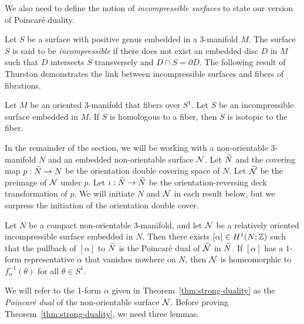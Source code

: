 We also need to define the notion of \emph{incompressible surfaces} to state our version of Poincar\'e duality.

  Let $S$ be a surface with positive genus embedded in a $3$-manifold $M$.
  The surface $S$ is said to be \emph{incompressible} if there does not exist an embedded disc $D$ in $M$ such that $D$ intersects $S$ transversely and $D \cap S = \partial D$.
  The following result of Thurston demonstrates the link between incompressible surfaces and fibers of fibrations.

\begin{thm}
  \label{thm:Thur2}
Let $M$ be an oriented 3-manifold that fibers over $S^1$.  Let $S$ be an incompressible surface embedded in $M$.  If $S$ is homologous to a fiber, then $S$ is isotopic to the fiber.
\end{thm}



In the remainder of the section, we will be working with a non-orientable 3-manifold $N$ and an embedded non-orientable surface $\mathcal{N}$.   Let $\widetilde{N}$ and the covering map $p:\widetilde{N}\rightarrow N$ be the orientation double covering space of $N$.  Let $\widetilde{\mathcal{N}}$ be the preimage of $\mathcal{N}$ under $p$.  Let $\iota:\widetilde{N}\rightarrow\widetilde{N}$ be the orientation-reversing deck transformation of $p$.  We will initiate $N$ and $\mathcal{N}$ in each result below, but we surpress the initiation of the orientation double cover.

\begin{thm}
  \label{thm:strong-duality}
  Let $N$ be a compact non-orientable $3$-manifold, and let $\mathcal{N}$ be a relatively oriented incompressible surface embedded in $N$.
  Then there exists $[\alpha] \in H^1(N; \mathbb{Z})$ such that the pullback of $[\alpha]$ to $\widetilde{N}$ is the Poincar\'e dual of $\widetilde{\mathcal{N}}$ in $\widetilde{N}$.
  If $[\alpha]$ has a $1$-form representative $\alpha$ that vanishes nowhere on $N$, then $\mathcal{N}$ is homeomorphic to $f_{\alpha}^{-1}(\theta)$ for all $\theta \in S^1$.
\end{thm}

We will refer to the 1-form $\alpha$ given in Theorem~\ref{thm:strong-duality} as the {\it Poincar\'e dual} of the non-orientable surface $\mathcal{N}$.  Before proving Theorem~\ref{thm:strong-duality}, we need three lemmas.

